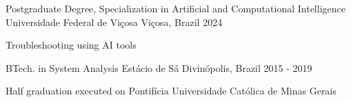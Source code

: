 

\begin{cventries}
  \cventry
    {Postgraduate Degree, Specialization in Artificial and Computational Intelligence} %
    {Universidade Federal de Viçosa} %
    {Viçosa, Brazil} %
    {2024} %
    {
      \begin{cvitems} %
        \item {Troubleshooting using AI tools}
      \end{cvitems}
    }
  \cventry
    {BTech. in System Analysis} %
    {Estácio de Sá} %
    {Divinópolis, Brazil} %
    {2015 - 2019} %
    {
      \begin{cvitems} %
        \item {Half graduation executed on Pontifícia Universidade Católica de Minas Gerais}
      \end{cvitems}
    }

\end{cventries}
